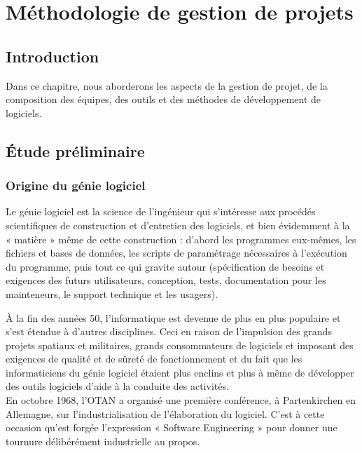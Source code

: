 \section{Méthodologie de gestion de projets}
\subsection{Introduction}
Dans ce chapitre, nous aborderons les aspects de la gestion de projet, de la composition des équipes, des outils et des méthodes de développement de logiciels.
\subsection{Étude préliminaire}
\subsubsection{Origine du génie logiciel}
\begin{beware}[title=Définition : ]
Le génie logiciel est la science de l'ingénieur qui s'intéresse aux procédés scientifiques de construction et d'entretien des logiciels, et bien évidemment à la « matière » même de cette construction : d'abord les programmes eux-mêmes, les fichiers et bases de données, les scripts de paramétrage nécessaires à l'exécution du programme, puis tout ce qui gravite autour (spécification de besoins et exigences des futurs utilisateurs, conception, tests, documentation pour les mainteneurs, le support technique et les usagers)\cite{origine_gl1}.
\end{beware}

À la fin des années 50, l’informatique est devenue de plus en plus populaire et s’est étendue à d’autres disciplines. Ceci en raison de l’impulsion des grands projets spatiaux et militaires, grands consommateurs de logiciels et imposant des exigences de qualité et de sûreté de fonctionnement et du fait que les informaticiens du génie logiciel étaient plus enclins et plus à même de développer des outils logiciels d’aide à la conduite des activités.\\

En octobre 1968, l'OTAN a organisé une première conférence, à Partenkirchen en Allemagne, sur l’industrialisation de l’élaboration du logiciel. C’est à cette occasion qu'est forgée l’expression « Software Engineering » pour donner une tournure délibérément industrielle au propos\cite{origine_gl3}.\\

